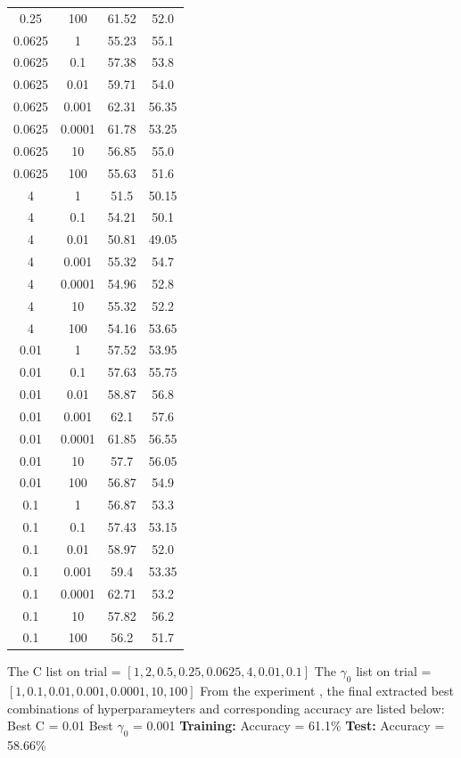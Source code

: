 \documentclass{article}
\begin{document}
\begin{longtable}{c|c|c|c}
	  0.25 & 100 & 61.52 & 52.0 \\
	  0.0625 & 1 & 55.23 & 55.1 \\
	  0.0625 & 0.1 & 57.38 & 53.8 \\
	  0.0625 & 0.01 & 59.71 & 54.0 \\
	  0.0625 & 0.001 & 62.31 & 56.35 \\
	  0.0625 & 0.0001 & 61.78 & 53.25 \\
	  0.0625 & 10 & 56.85 & 55.0 \\
	  0.0625 & 100 & 55.63 & 51.6 \\
	  4 & 1 & 51.5 & 50.15 \\
	  4 & 0.1 & 54.21 & 50.1 \\
	  4 & 0.01 & 50.81 & 49.05 \\
	  4 & 0.001 & 55.32 & 54.7 \\
	  4 & 0.0001 & 54.96 & 52.8 \\
	  4 & 10 & 55.32 & 52.2 \\
	  4 & 100 & 54.16 & 53.65 \\
	  0.01 & 1 & 57.52 & 53.95 \\
	  0.01 & 0.1 & 57.63 & 55.75 \\
	  0.01 & 0.01 & 58.87 & 56.8 \\
	  0.01 & 0.001 & 62.1 & 57.6 \\
	  0.01 & 0.0001 & 61.85 & 56.55 \\
	  0.01 & 10 & 57.7 & 56.05 \\
	  0.01 & 100 & 56.87 & 54.9 \\
	  0.1 & 1 & 56.87 & 53.3 \\
	  0.1 & 0.1 & 57.43 & 53.15 \\
	  0.1 & 0.01 & 58.97 & 52.0 \\
	  0.1 & 0.001 & 59.4 & 53.35 \\
	  0.1 & 0.0001 & 62.71 & 53.2 \\
	  0.1 & 10 & 57.82 & 56.2 \\
	  0.1 & 100 & 56.2 & 51.7 \\ [1ex]
  \end{longtable}

  The C list on trial = $[1, 2, 0.5, 0.25, 0.0625, 4, 0.01, 0.1]$ \newline
  The $\gamma_0$ list on trial = $[1, 0.1, 0.01, 0.001, 0.0001, 10, 100]$ \newline
  From the experiment , the final extracted best combinations of hyperparameyters and corresponding accuracy are listed below: \newline
  Best C = 0.01 \newline
  Best $\gamma_0$ = 0.001 \newline
  \textbf {Training:} Accuracy = 61.1\% \newline
  \textbf {Test:} Accuracy = 58.66\% \newline
\end{document}
